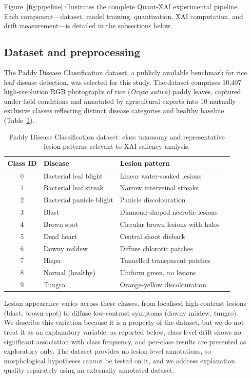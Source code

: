 \documentclass[fleqn,10pt]{wlscirep}
\begin{document}
Figure~\ref{fig:pipeline} illustrates the complete Quant-XAI experimental pipeline. Each component---dataset, model training, quantization, XAI computation, and drift measurement---is detailed in the subsections below.




\subsection*{Dataset and preprocessing}

The Paddy Disease Classification dataset\cite{PaddyDisease2022}, a publicly available benchmark for rice leaf disease detection, was selected for this study. The dataset comprises 10{,}407 high-resolution RGB photographs of rice (\emph{Oryza sativa}) paddy leaves, captured under field conditions and annotated by agricultural experts into 10 mutually exclusive classes reflecting distinct disease categories and healthy baseline (Table~\ref{tab:paddy_dist}).

\begin{table}[!ht]
\centering
\caption{Paddy Disease Classification dataset: class taxonomy and representative lesion patterns relevant to XAI saliency analysis.}
\label{tab:paddy_dist}
\begin{tabular}{clll}
\toprule
\textbf{Class ID} & \textbf{Disease} & \textbf{Lesion pattern} \\
\midrule
0 & Bacterial leaf blight & Linear water-soaked lesions \\
1 & Bacterial leaf streak & Narrow interveinal streaks \\
2 & Bacterial panicle blight & Panicle discolouration \\
3 & Blast & Diamond-shaped necrotic lesions \\
4 & Brown spot & Circular brown lesions with halos \\
5 & Dead heart & Central shoot dieback \\
6 & Downy mildew & Diffuse chlorotic patches \\
7 & Hispa & Tunnelled transparent patches \\
8 & Normal (healthy) & Uniform green, no lesions \\
9 & Tungro & Orange-yellow discolouration \\
\bottomrule
\end{tabular}
\end{table}

Lesion appearance varies across these classes, from localised high-contrast lesions (blast, brown spot) to diffuse low-contrast symptoms (downy mildew, tungro). We describe this variation because it is a property of the dataset, but we do not treat it as an explanatory variable: as reported below, class-level drift shows no significant association with class frequency, and per-class results are presented as exploratory only. The dataset provides no lesion-level annotations, so morphological hypotheses cannot be tested on it, and we address explanation quality separately using an externally annotated dataset.
\end{document}
